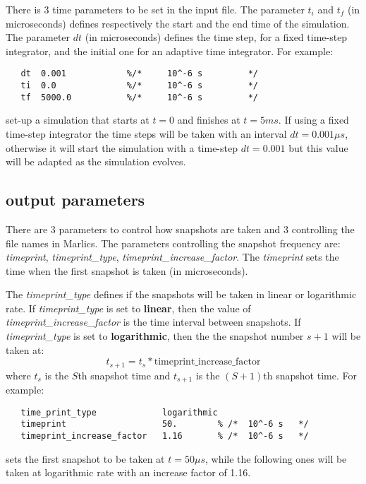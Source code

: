 \documentclass{article}
\begin{document}
There is 3 time parameters to be set in the input file. The parameter
$t_i$ and $t_f$ (in microseconds) defines respectively the start and
the end time of the simulation. The parameter $dt$ (in microseconds)
defines the time step, for a fixed time-step integrator, and the
initial one for an adaptive time integrator.  For example:
\begin{lstlisting}
   dt  0.001            %/*     10^-6 s         */	
   ti  0.0              %/*     10^-6 s         */	
   tf  5000.0           %/*     10^-6 s         */
\end{lstlisting}
set-up a simulation that starts at $t=0$ and finishes at $t=5 ms$. If
using a fixed time-step integrator the time steps will be taken with
an interval $dt=0.001 \mu s$, otherwise it will start the simulation
with a time-step $dt=0.001$ but this value will be adapted as the
simulation evolves.

\subsection{output parameters}\label{snapshot.param}


There are 3 parameters to control how snapshots are taken and 3 controlling the file names in Marlics. The parameters controlling the snapshot frequency are: \textit{timeprint}, \textit{timeprint_type}, \textit{timeprint_increase_factor}. The \textit{timeprint} sets the time when the first snapshot is taken (in microseconds). 

The \textit{timeprint_type} defines if the snapshots will be taken in
linear or logarithmic rate.  If \textit{timeprint_type} is set to
\textbf{linear}, then the value of \textit{timeprint_increase_factor}
is the time interval between snapshots. If \textit{timeprint_type} is
set to \textbf{logarithmic}, then the the snapshot number $s+1$ will
be taken at:
\begin{equation}
  t_{s+1}=t_s *\textrm{timeprint_increase_factor}
\end{equation}
where $t_s$ is the $S$th snapshot time and $t_{s+1}$ is the $(S+1)$th snapshot time. For example:
\begin{lstlisting}
   time_print_type             logarithmic
   timeprint                   50.        % /*  10^-6 s   */
   timeprint_increase_factor   1.16       % /*  10^-6 s   */     
\end{lstlisting}
sets the first snapshot to be taken at $t=50 \mu s$, while the
following ones will be taken at logarithmic rate with an increase
factor of 1.16.
\end{document}
